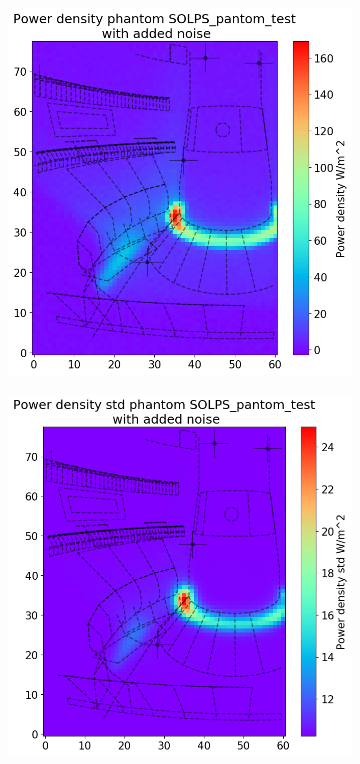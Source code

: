 \begin{figure}[!ht]
     \begin{subfigure}{0.45\linewidth}
         \centering
         \includegraphics[trim={0 0 0 45},clip,width=\textwidth]{Chapters/chapter2/figs/inversion_comparison_foil_power_SOLPS_pantom_test.png}
         \caption{}
         \label{fig:SOLPS_phantom1a}
     \end{subfigure}
     \hfill
     \begin{subfigure}{0.45\linewidth}
         \centering
         \includegraphics[trim={0 0 0 45},clip,width=\textwidth]{Chapters/chapter2/figs/inversion_comparison_foil_power_std_SOLPS_pantom_test.png}

\end{subfigure}
\end{figure}

